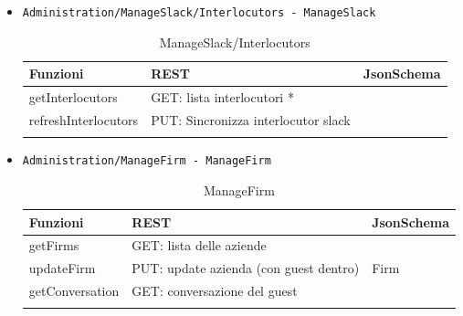 \documentclass[../DefinizioneDiProdotto_v3.0.0.tex]{subfiles}
\begin{document}
\begin{itemize}
	\item \texttt{Administration/ManageSlack/Interlocutors - ManageSlack}
	      \begin{longtable}[c] { >{\centering\arraybackslash}p{4cm} >{\centering\arraybackslash}p{6cm} >{\centering\arraybackslash}p{3cm}}
	      	\toprule
	      	\centerline{\textbf{Funzioni}} & \centerline{\textbf{REST}}          & \centerline{\textbf{JsonSchema}} \\
	      	\midrule
	      	getInterlocutors               & GET: lista interlocutori *          &                                  \\
	      	\addlinespace[0.3em]
	      	\midrule
	      	\addlinespace[0.3em]
	      	refreshInterlocutors           & PUT: Sincronizza interlocutor slack &                                  \\
	      	\bottomrule
	      	\caption{ManageSlack/Interlocutors}
	      \end{longtable}
	      \newpage
	\item \texttt{Administration/ManageFirm - ManageFirm}
	      \begin{longtable}[c] { >{\centering\arraybackslash}p{3cm} >{\centering\arraybackslash}p{6cm} >{\centering\arraybackslash}p{3cm}}
	      	\toprule
	      	\centerline{\textbf{Funzioni}} & \centerline{\textbf{REST}}             & \centerline{\textbf{JsonSchema}} \\
	      	\midrule
	      	getFirms                       & GET: lista delle aziende               &                                  \\
	      	\addlinespace[0.3em]
	      	\midrule
	      	\addlinespace[0.3em]
	      	updateFirm                     & PUT: update azienda (con guest dentro) & Firm                             \\
	      	\addlinespace[0.3em]
	      	\midrule
	      	\addlinespace[0.3em]
	      	getConversation                & GET: conversazione del guest           &                                  \\

	      	\bottomrule
	      	\caption{ManageFirm}
	      \end{longtable}


\end{itemize}
\end{document}
